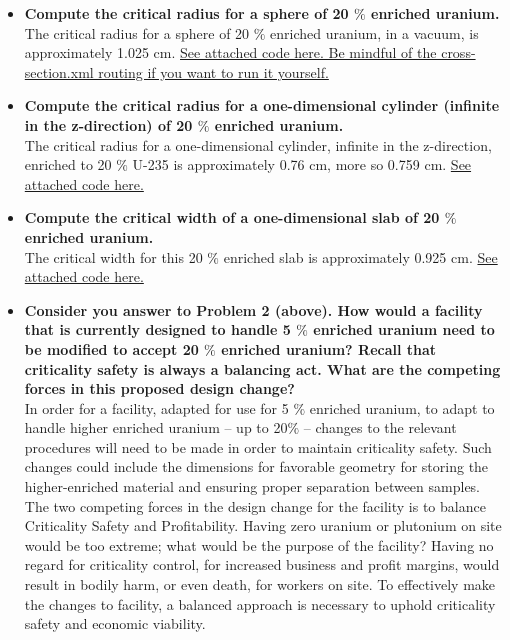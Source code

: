\documentclass[11pt,a4paper]{article}
\begin{document}
\begin{itemize}
\item \textbf{Compute the critical radius for a sphere of 20 $\%$ enriched uranium.}
\\

The critical radius for a sphere of 20 $\%$ enriched uranium, in a vacuum, is approximately 1.025 cm. \href{https://github.com/HeartUnderSnow/NE5350-Nuclear-Criticality-Safety/blob/main/Projects/I/HALEUsphere.py}{See attached code here. Be mindful of the cross-section.xml routing if you want to run it yourself.}
\\

\item \textbf{Compute the critical radius for a one-dimensional cylinder (infinite in the z-direction) of 20 $\%$ enriched uranium.}
\\

The critical radius for a one-dimensional cylinder, infinite in the z-direction, enriched to 20 $\%$ U-235 is approximately 0.76 cm, more so 0.759 cm. \href{https://github.com/HeartUnderSnow/NE5350-Nuclear-Criticality-Safety/blob/main/Projects/I/HALEUcylinder.py}{See attached code here.}

\item \textbf{Compute the critical width of a one-dimensional slab of 20 $\%$ enriched uranium.}
\\
The critical width for this 20 $\%$ enriched slab is approximately 0.925 cm. \href{https://github.com/HeartUnderSnow/NE5350-Nuclear-Criticality-Safety/blob/main/Projects/I/HALEUslab.py}{See attached code here.}

\item \textbf{Consider you answer to Problem 2 (above). How would a facility that is currently
designed to handle 5 $\%$ enriched uranium need to be modified to accept 20 $\%$ enriched
uranium? Recall that criticality safety is always a balancing act. What are the competing
forces in this proposed design change?}
\\

In order for a facility, adapted for use for 5 $\%$ enriched uranium, to adapt to handle higher enriched uranium -- up to 20$\%$ -- changes to the relevant procedures will need to be made in order to maintain criticality safety. Such changes could include the dimensions for favorable geometry for storing the higher-enriched material and ensuring proper separation between samples. The two competing forces in the design change for the facility is to balance Criticality Safety and Profitability. Having zero uranium or plutonium on site would be too extreme; what would be the purpose of the facility? Having no regard for criticality control, for increased business and profit margins, would result in bodily harm, or even death, for workers on site. To effectively make the changes to facility, a balanced approach is necessary to uphold criticality safety and economic viability.
\end{itemize}
\end{document}
